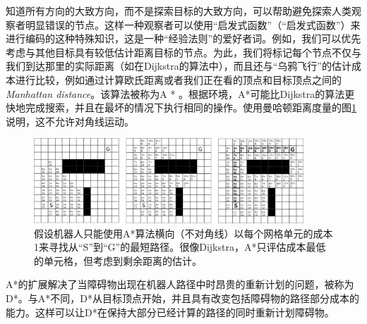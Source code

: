 知道所有方向的大致方向，而不是探索目标的大致方向，可以帮助避免探索人类观察者明显错误的节点。这样一种观察者可以使用“启发式函数”（“启发式函数”）来进行编码的这种特殊知识，这是一种“经验法则”的爱好者词。例如，我们可以优先考虑与其他目标具有较低估计距离目标的节点。为此，我们将标记每个节点不仅与我们到达那里的实际距离（如在Dijkstra的算法中），而且还与“乌鸦飞行”的估计成本进行比较，例如通过计算欧氏距离或者我们正在看的顶点和目标顶点之间的\emph{Manhattan distance}。该算法被称为A * \cite{hart1968formal}。根据环境，A*可能比Dijkstra的算法更快地完成搜索，并且在最坏的情况下执行相同的操作。使用曼哈顿距离度量的图\ref{fig:astargrid}说明，这不允许对角线运动。


\begin{figure}[htb]
\centering
\includegraphics[width=0.9\textwidth]{figs/astargrid}
\caption{假设机器人只能使用A*算法横向（不对角线）以每个网格单元的成本1来寻找从“S”到“G”的最短路径。很像Dijkstra，A*只评估成本最低的单元格，但考虑到剩余距离的估计。\label{fig:astargrid}}
\end{figure}


A*的扩展解决了当障碍物出现在机器人路径中时昂贵的重新计划的问题，被称为D*\cite{stentz1994optimal}。与A*不同，D*从目标顶点开始，并且具有改变包括障碍物的路径部分成本的能力。这样可以让D*在保持大部分已经计算的路径的同时重新计划障碍物。


